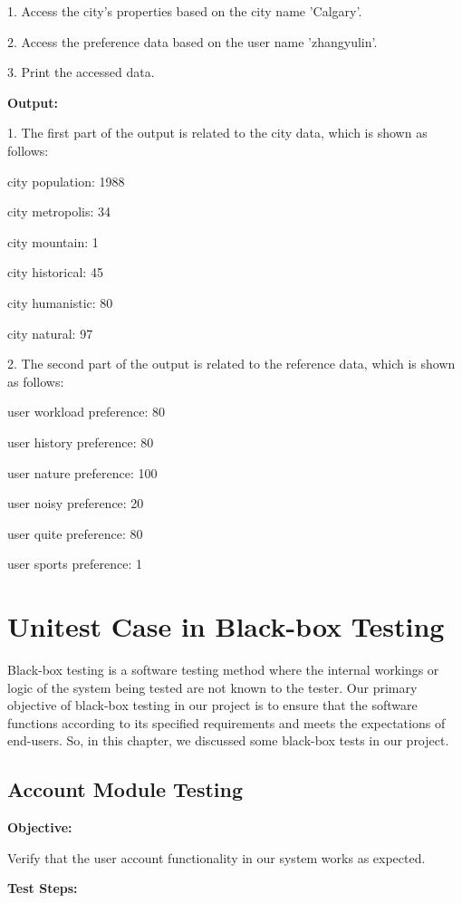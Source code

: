 \documentclass[conference]{IEEEtran}
\begin{document}
1. Access the city's properties based on the city name 'Calgary'.

2. Access the preference data based on the user name 'zhangyulin'.

3. Print the accessed data.

 \textbf{ Output: }

1. The first part of the output is related to the city data, which is shown as follows:

city population: 1988

city metropolis: 34

city mountain: 1

city historical: 45

city humanistic: 80

city natural: 97


2. The second part of the output is related to the reference data, which is shown as follows:

user workload preference: 80

user history preference: 80

user nature preference: 100

user noisy preference: 20

user quite preference: 80

user sports preference: 1


\section{ \textbf{ Unitest Case in Black-box Testing}}


Black-box testing is a software testing method where the internal workings or logic of the system being tested are not known to the tester. Our primary objective of black-box testing in our project is to ensure that the software functions according to its specified requirements and meets the expectations of end-users. So, in this chapter, we discussed some black-box tests in our project.



\subsection{ \textbf{ Account Module Testing}}

\textbf{ Objective: }

Verify that the user account functionality in our system works as expected.

\textbf{Test Steps: }
\end{document}
